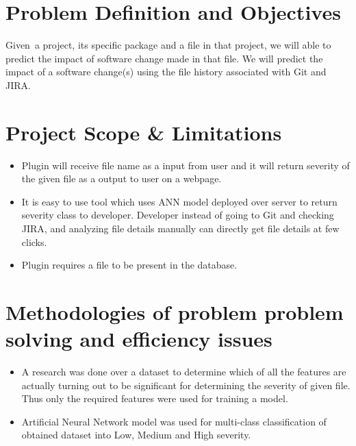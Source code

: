 \documentclass[oneside,a4paper,12pt]{book}
\begin{document}
\setlength{\parskip}{9.96pt}
\pagebreak \par

\section{Problem Definition and Objectives}
\begin{justify}
Given\ a project, its specific package and a file in that project, we will able to predict the impact of software change  made in that file. We will predict the impact of a software change(s) using the file history associated with Git and JIRA.
\end{justify}\par

\section{Project Scope \& Limitations }
\setlength{\parskip}{0.0pt}
\begin{itemize}
	\item Plugin will receive file name as a input from user and it will return severity of the given file as a output to user on a webpage.\par

\setlength{\parskip}{9.96pt}
	\item It is easy to use tool which uses ANN model deployed over server to return severity class to developer. Developer instead of going to Git and checking JIRA, and analyzing file details manually can directly get file details at few clicks.\par
	
	\item Plugin requires a file to be present in the database.\par
\end{itemize}

\section{Methodologies of problem problem solving and efficiency issues}
\setlength{\parskip}{0.0pt}
\begin{itemize}
    \item
     A research was done over a dataset to determine which of all the features are actually turning out to be significant for determining the severity of given file. Thus only the required features were used for training a model.
    \par
    	\item Artificial Neural Network model was used  for multi-class classification of obtained dataset into Low, Medium and High severity.\par
\end{itemize}
\end{document}
